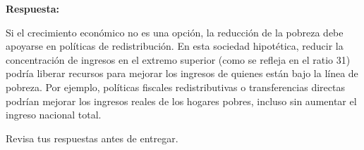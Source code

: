 \documentclass[
]{article}
\begin{document}
\textbf{Respuesta:}

Si el crecimiento económico no es una opción, la reducción de la pobreza
debe apoyarse en políticas de redistribución. En esta sociedad
hipotética, reducir la concentración de ingresos en el extremo superior
(como se refleja en el ratio 31) podría liberar recursos para mejorar
los ingresos de quienes están bajo la línea de pobreza. Por ejemplo,
políticas fiscales redistributivas o transferencias directas podrían
mejorar los ingresos reales de los hogares pobres, incluso sin aumentar
el ingreso nacional total.

\begin{tcolorbox}[enhanced jigsaw, colbacktitle=quarto-callout-tip-color!10!white, colback=white, rightrule=.15mm, toprule=.15mm, coltitle=black, bottomtitle=1mm, toptitle=1mm, opacityback=0, leftrule=.75mm, breakable, title=\textcolor{quarto-callout-tip-color}{\faLightbulb}\hspace{0.5em}{Fin del examen}, colframe=quarto-callout-tip-color-frame, opacitybacktitle=0.6, bottomrule=.15mm, titlerule=0mm, arc=.35mm, left=2mm]

Revisa tus respuestas antes de entregar.

\end{tcolorbox}
\end{document}
